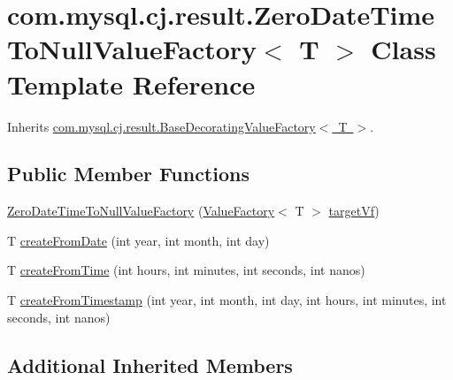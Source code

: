\hypertarget{classcom_1_1mysql_1_1cj_1_1result_1_1_zero_date_time_to_null_value_factory}{}\section{com.\+mysql.\+cj.\+result.\+Zero\+Date\+Time\+To\+Null\+Value\+Factory$<$ T $>$ Class Template Reference}
\label{classcom_1_1mysql_1_1cj_1_1result_1_1_zero_date_time_to_null_value_factory}


Inherits \mbox{\hyperlink{classcom_1_1mysql_1_1cj_1_1result_1_1_base_decorating_value_factory}{com.\+mysql.\+cj.\+result.\+Base\+Decorating\+Value\+Factory$<$ T $>$}}.

\subsection*{Public Member Functions}
\begin{DoxyCompactItemize}
\item 
\mbox{\hyperlink{classcom_1_1mysql_1_1cj_1_1result_1_1_zero_date_time_to_null_value_factory_ae4db69d63ed6dca395ad822b7585577f}{Zero\+Date\+Time\+To\+Null\+Value\+Factory}} (\mbox{\hyperlink{interfacecom_1_1mysql_1_1cj_1_1result_1_1_value_factory}{Value\+Factory}}$<$ T $>$ \mbox{\hyperlink{classcom_1_1mysql_1_1cj_1_1result_1_1_base_decorating_value_factory_a64c2c62bd9906ec3af7fc62e58bf34b3}{target\+Vf}})
\item 
T \mbox{\hyperlink{classcom_1_1mysql_1_1cj_1_1result_1_1_zero_date_time_to_null_value_factory_a9c5174a7c37d8a880505d0bfcaccb891}{create\+From\+Date}} (int year, int month, int day)
\item 
T \mbox{\hyperlink{classcom_1_1mysql_1_1cj_1_1result_1_1_zero_date_time_to_null_value_factory_a22e98e55a6975488e6f74fb406141a31}{create\+From\+Time}} (int hours, int minutes, int seconds, int nanos)
\item 
T \mbox{\hyperlink{classcom_1_1mysql_1_1cj_1_1result_1_1_zero_date_time_to_null_value_factory_acda714c019ea312d52c002f606ca097b}{create\+From\+Timestamp}} (int year, int month, int day, int hours, int minutes, int seconds, int nanos)
\end{DoxyCompactItemize}
\subsection*{Additional Inherited Members}


